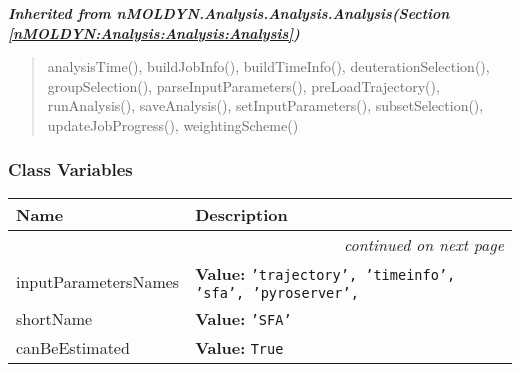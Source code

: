 \large{\textbf{\textit{Inherited from nMOLDYN.Analysis.Analysis.Analysis\textit{(Section \ref{nMOLDYN:Analysis:Analysis:Analysis})}}}}

\begin{quote}
analysisTime(), buildJobInfo(), buildTimeInfo(), deuterationSelection(), groupSelection(), parseInputParameters(), preLoadTrajectory(), runAnalysis(), saveAnalysis(), setInputParameters(), subsetSelection(), updateJobProgress(), weightingScheme()
\end{quote}


  \subsubsection{Class Variables}

    \vspace{-1cm}
\hspace{\varindent}\begin{longtable}{|p{\varnamewidth}|p{\vardescrwidth}|l}
\cline{1-2}
\cline{1-2} \centering \textbf{Name} & \centering \textbf{Description}& \\
\cline{1-2}
\endhead\cline{1-2}\multicolumn{3}{r}{\small\textit{continued on next page}}\\\endfoot\cline{1-2}
\endlastfoot\raggedright i\-n\-p\-u\-t\-P\-a\-r\-a\-m\-e\-t\-e\-r\-s\-N\-a\-m\-e\-s\- & \raggedright \textbf{Value:} 
{\tt 'trajectory', 'timeinfo', 'sfa', 'pyroserver',}&\\
\cline{1-2}
\raggedright s\-h\-o\-r\-t\-N\-a\-m\-e\- & \raggedright \textbf{Value:} 
{\tt 'SFA'}&\\
\cline{1-2}
\raggedright c\-a\-n\-B\-e\-E\-s\-t\-i\-m\-a\-t\-e\-d\- & \raggedright \textbf{Value:} 
{\tt True}&\\
\cline{1-2}
\end{longtable}



